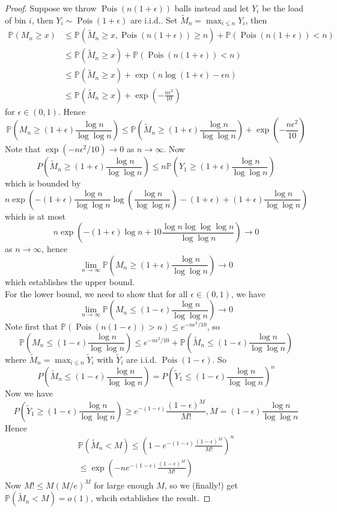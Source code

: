 \begin{proof}
    Suppose we throw $\operatorname{Pois}(n(1+\epsilon))$ balls instead and let $Y_i$ be the load of bin $i$, then $Y_i\sim\operatorname{Pois}(1+\epsilon)$ are i.i.d..
    Set $\tilde{M}_n=\max_{i\le n}Y_i$, then
    \begin{align*}
        \mathbb P(M_n\ge x)&\le\mathbb P(\tilde{M}_n\ge x,\operatorname{Pois}(n(1+\epsilon))\ge n)+\mathbb P(\operatorname{Pois}(n(1+\epsilon))<n)\\
        &\le\mathbb P(\tilde{M}_n\ge x)+\mathbb P(\operatorname{Pois}(n(1+\epsilon))<n)\\
        &\le\mathbb P(\tilde{M}_n\ge x)+\exp(n\log (1+\epsilon)-\epsilon n)\\
        &\le\mathbb P(\tilde{M}_n\ge x)+\exp\left( -\frac{n\epsilon^2}{10} \right)
    \end{align*}
    for $\epsilon\in(0,1)$.
    Hence
    $$\mathbb P\left(M_n\ge(1+\epsilon)\frac{\log n}{\log\log n}\right)\le\mathbb P\left(\tilde{M}_n\ge(1+\epsilon)\frac{\log n}{\log\log n}\right)+\exp\left( -\frac{n\epsilon^2}{10} \right)$$
    Note that $\exp(-n\epsilon^2/10)\to 0$ as $n\to\infty$.
    Now
    $$P\left(\tilde{M}_n\ge(1+\epsilon)\frac{\log n}{\log\log n}\right)\le n\mathbb P\left( Y_1\ge (1+\epsilon)\frac{\log n}{\log\log n} \right)$$
    which is bounded by
    $$n\exp\left( -(1+\epsilon)\frac{\log n}{\log\log n}\log\left( \frac{\log n}{\log\log n} \right)-(1+\epsilon)+(1+\epsilon)\frac{\log n}{\log\log n} \right)$$
    which is at most
    $$n\exp\left( -(1+\epsilon)\log n+10\frac{\log n\log\log\log n}{\log\log n} \right)\to 0$$
    as $n\to\infty$, hence
    $$\lim_{n\to\infty}\mathbb P\left(M_n\ge(1+\epsilon)\frac{\log n}{\log\log n}\right)\to 0$$
    which establishes the upper bound.\\
    For the lower bound, we need to show that for all $\epsilon\in(0,1)$, we have
    $$\lim_{n\to\infty}\mathbb P\left( M_n\le(1-\epsilon)\frac{\log n}{\log\log n} \right)\to 0$$
    Note first that $\mathbb P(\operatorname{Pois}(n(1-\epsilon))>n)\le e^{-n\epsilon^2/10}$, so
    $$\mathbb P\left( M_n\le(1-\epsilon)\frac{\log n}{\log\log n} \right)\le e^{-n\epsilon^2/10}+\mathbb P\left( \tilde{M}_n\le(1-\epsilon)\frac{\log n}{\log\log n} \right)$$
    where $\tilde{M}_n=\max_{i\le n}\tilde{Y}_i$ with $\tilde{Y}_i$ are i.i.d. $\operatorname{Pois}(1-\epsilon)$.
    So
    $$P\left( \tilde{M}_n\le(1-\epsilon)\frac{\log n}{\log\log n}\right)=P\left( \tilde{Y}_1\le(1-\epsilon)\frac{\log n}{\log\log n} \right)^n$$
    Now we have
    $$P\left( \tilde{Y}_1\ge(1-\epsilon)\frac{\log n}{\log\log n}\right)\ge e^{-(1-\epsilon)}\frac{(1-\epsilon)^M}{M!},M=(1-\epsilon)\frac{\log n}{\log\log n}$$
    Hence
    \begin{align*}
        \mathbb P(\tilde{M}_n<M)\le\left( 1-e^{-(1-\epsilon)}\frac{(1-\epsilon)^M}{M!} \right)^n\\
        \le\exp\left(-ne^{-(1-\epsilon)}\frac{(1-\epsilon)^M}{M!}\right)
    \end{align*}
    Now $M!\le M(M/e)^M$ for large enough $M$, so we (finally!) get $\mathbb P(\tilde{M}_n<M)=o(1)$, whcih establishes the result.
\end{proof}
